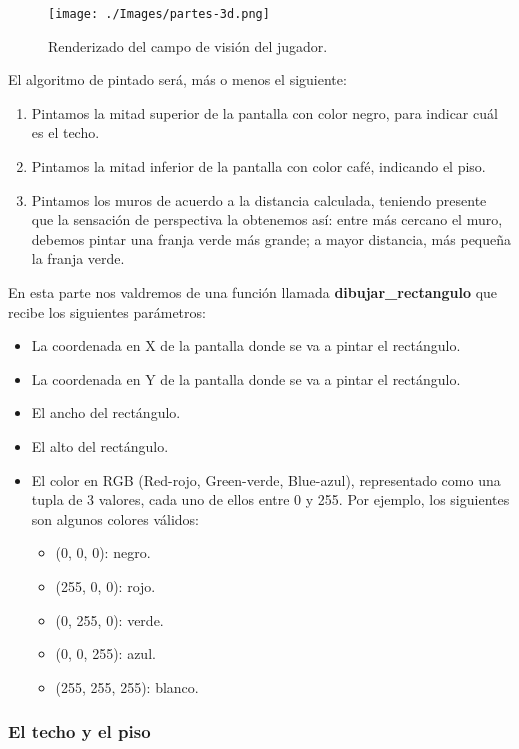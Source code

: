 \begin{figure}[h!]
	\centering
	\texttt{[image: ./Images/partes-3d.png]}
	\caption{Renderizado del campo de visión del jugador.}
	\label{partes-3d}
\end{figure}

El algoritmo de pintado será, más o menos el siguiente: 

\begin{enumerate}
\item Pintamos la mitad superior de la pantalla con color negro, para indicar cuál es el techo.
\item Pintamos la mitad inferior de la pantalla con color café, indicando el piso.
\item Pintamos los muros de acuerdo a la distancia calculada, teniendo presente que la sensación de perspectiva la obtenemos así: entre más cercano el muro, debemos pintar una franja verde más grande; a mayor distancia, más pequeña la franja verde.
\end{enumerate}

En esta parte nos valdremos de una función llamada \textbf{dibujar\_rectangulo} que recibe los siguientes parámetros:

\begin{itemize}
\item La coordenada en X de la pantalla donde se va a pintar el rectángulo.
\item La coordenada en Y de la pantalla donde se va a pintar el rectángulo.
\item El ancho del rectángulo.
\item El alto del rectángulo.
\item El color en RGB (Red-rojo, Green-verde, Blue-azul), representado como una tupla de 3 valores, cada uno de ellos entre 0 y 255. Por ejemplo, los siguientes son algunos colores válidos:
	\begin{itemize}
	\item (0, 0, 0): negro.
	\item (255, 0, 0): rojo.
	\item (0, 255, 0): verde.
	\item (0, 0, 255): azul.
	\item (255, 255, 255): blanco.
	\end{itemize}
\end{itemize}

\subsubsection{El techo y el piso}

